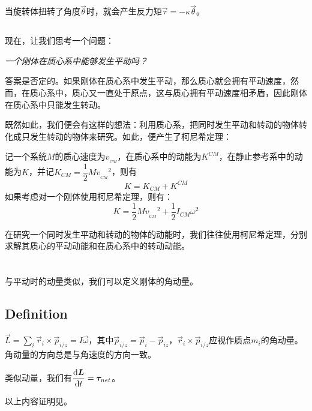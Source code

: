 当旋转体扭转了角度$\vec{\theta}$时，就会产生反力矩$\vec{\tau}=-\kappa\vec{\theta}$。
\subsection[同时发生转动与平动时的能量]{}
现在，让我们思考一个问题：
\begin{center}
	\itshape 一个刚体在质心系中能够发生平动吗？
\end{center}

答案是否定的。如果刚体在质心系中发生平动，那么质心就会拥有平动速度，然而，在质心系中，质心又一直处于原点，这与质心拥有平动速度相矛盾，因此刚体在质心系中只能发生转动。

既然如此，我们便会有这样的想法：利用质心系，把同时发生平动和转动的物体转化成只发生转动的物体来研究。如此，便产生了柯尼希定理：

\begin{law}
	记一个系统$M$的质心速度为$v_{_{CM}}$，在质心系中的动能为$K^{CM}$，在静止参考系中的动能为$K$，并记$K_{CM}=\dfrac{1}{2}Mv_{_{CM}}{}^2$，则有
	\[K=K_{CM}+K^{CM}\]
	如果考虑对一个刚体使用柯尼希定理，则有：
	\[K=\dfrac{1}{2}Mv_{_{CM}}{}^2+\dfrac{1}{2}I_{CM}\omega^2\]
\end{law}

在研究一个同时发生平动和转动的物体的动能时，我们往往使用柯尼希定理，分别求解其质心的平动动能和在质心系中的转动动能。
\section[角动量]{}
与平动时的动量类似，我们可以定义刚体的角动量。
\subsection[定义]{Definition}
\begin{Itemize}
	\item {} $\displaystyle\vec{L}=\sum_i\vec{r}_i\times\vec{p}_{i/z}=I\vec{\omega}$，其中$\vec{p}_{i/z}=\vec{p}_i-\vec{p}_{iz}$，$ \vec{r}_i\times\vec{p}_{i/z}$应视作质点$m_i$的角动量。角动量的方向总是与角速度的方向一致\footnotemark。
	\item 类似动量，我们有$\dfrac{\dif \vec{L}}{\dif t}=\vec{\tau}_{net}$。
\end{Itemize}
以上内容证明见。

